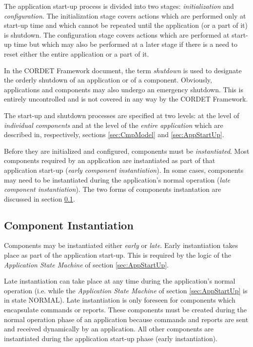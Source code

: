 \documentclass{pnp_article}
\begin{document}
The application start-up process is divided into two stages: \textit{initialization} and \textit{configuration}. The initialization stage covers actions which are performed only at start-up time and which cannot be repeated until the application (or a part of it) is shutdown. The configuration stage covers actions which are performed at start-up time but which may also be performed at a later stage if there is a need to reset either the entire application or a part of it. 

In the CORDET Framework document, the term \textit{shutdown} is used to designate the orderly shutdown of an application or of a component. Obviously, applications and components may also undergo an emergency shutdown. This is entirely uncontrolled and is not covered in any way by the CORDET Framework.

The start-up and shutdown processes are specified at two levels: at the level of \textit{individual components} and at the level of the \textit{entire application} which are described in, respectively, sections \ref{sec:CmpModel} and \ref{sec:AppStartUp}.

Before they are initialized and configured, components must be \textit{instantiated}. Most components required by an application are instantiated as part of that application start-up (\textit{early component instantiation}). In some cases, components may need to be instantiated during the application's normal operation (\textit{late component instantiation}). The two forms of components instantation are discussed in section \ref{sec:CmpInst}.

\subsection{Component Instantiation}\label{sec:CmpInst}
Components may be instantiated either \textit{early} or \textit{late}. Early instantiation takes place as part of the application start-up. This is required by the logic of the \textit{Application State Machine} of section \ref{sec:AppStartUp}.

Late instantiation can take place at any time during the application's normal operation (i.e. while the \textit{Application State Machine} of section \ref{sec:AppStartUp} is in state NORMAL). Late instantiation is only foreseen for components which encapsulate commands or reports. These components must be created during the normal operation phase of an application because commands and reports are sent and received dynamically by an application. All other components are instantiated during the application start-up phase (early instantiation).
\end{document}
